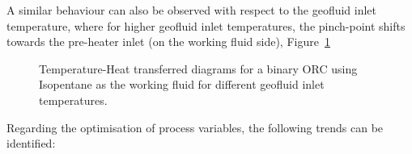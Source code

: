     A similar behaviour can also be observed with respect to the geofluid inlet temperature, where for higher geofluid inlet temperatures, the pinch-point shifts towards the pre-heater inlet (on the working fluid side), Figure~\ref{fig:prosim_purewater_isopentane_TQ_by_T}

    \begin{figure}[H]
        \centering
        
        \caption[TQ diagrams for a binary \ac{ORC} using Isopentane as the working fluid by inlet temperature.]{Temperature-Heat transferred diagrams for a binary \ac{ORC} using Isopentane as the working fluid for different geofluid inlet temperatures.}
        \label{fig:prosim_purewater_isopentane_TQ_by_T}
    \end{figure}

    Regarding the optimisation of process variables, the following trends can be identified:


